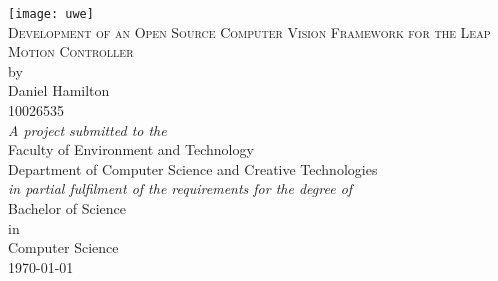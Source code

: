 \begin{titlepage}
	\begin{center}
		
		\texttt{[image: uwe]}~\\[1cm]		
		
		\textsc{\LARGE Development of an Open Source Computer Vision Framework for the Leap Motion Controller}\\[1.5cm]
		
		\Large by\\
		\Large Daniel Hamilton\\
		\Large 10026535\\[1.5cm]
		\textit{\small A project submitted to the}\\
		
		\Large Faculty of Environment and Technology\\
		\Large Department of Computer Science and Creative Technologies\\[1.5cm]
		
		\textit{\small in partial fulfilment of the requirements for the degree of}\\
		
		\Large Bachelor of Science\\
		\Large in\\
		\Large Computer Science\\[1cm]
		
		\small\today
		
	\end{center}
\end{titlepage}